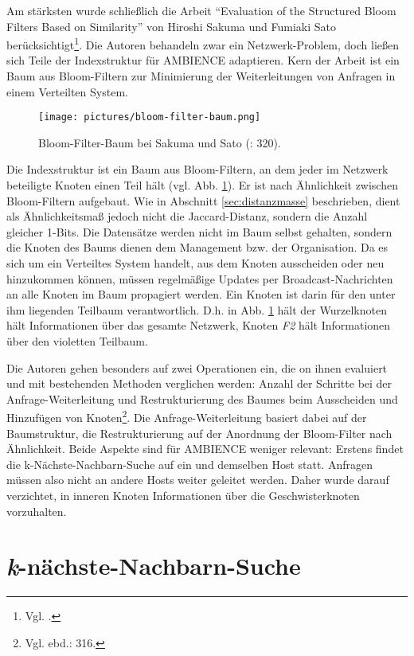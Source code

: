 Am stärksten wurde schließlich die Arbeit "`Evaluation of the Structured Bloom Filters Based on Similarity"' von Hiroshi Sakuma und Fumiaki Sato berücksichtigt\footnote{Vgl. \cite{Sakuma2011}.}. Die Autoren behandeln zwar ein Netzwerk-Problem, doch ließen sich Teile der Indexstruktur für AMBIENCE adaptieren. Kern der Arbeit ist ein Baum aus Bloom-Filtern zur Minimierung der Weiterleitungen von Anfragen in einem Verteilten System. 
\begin{figure}[hpbt]
  \centering
  \texttt{[image: pictures/bloom-filter-baum.png]}\\
  \caption[Bloom-Filter-Baum bei Sakuma und Sato (Bildnachweis: \cite{Sakuma2011}: 320)]{Bloom-Filter-Baum bei Sakuma und Sato (\cite{Sakuma2011}: 320).}\label{fig:pic5}
\end{figure}
Die Indexstruktur ist ein Baum aus Bloom-Filtern, an dem jeder im Netzwerk beteiligte Knoten einen Teil hält (vgl. Abb. \ref{fig:pic5}). Er ist nach Ähnlichkeit zwischen Bloom-Filtern aufgebaut. Wie in Abschnitt \ref{sec:distanzmasse} beschrieben, dient als Ähnlichkeitsmaß jedoch nicht die Jaccard-Distanz, sondern die Anzahl gleicher 1-Bits. Die Datensätze werden nicht im Baum selbst gehalten, sondern die Knoten des Baums dienen dem Management bzw. der Organisation. Da es sich um ein Verteiltes System handelt, aus dem Knoten ausscheiden oder neu hinzukommen können, müssen regelmäßige Updates per Broadcast-Nachrichten an alle Knoten im Baum propagiert werden. Ein Knoten ist darin für den unter ihm liegenden Teilbaum verantwortlich. D.h. in Abb. \ref{fig:pic5} hält der Wurzelknoten hält Informationen über das gesamte Netzwerk, Knoten \textit{F2} hält Informationen über den violetten Teilbaum. 

Die Autoren gehen besonders auf zwei Operationen ein, die on ihnen evaluiert und mit bestehenden Methoden verglichen werden: Anzahl der Schritte bei der Anfrage-Weiterleitung und Restrukturierung des Baumes beim Ausscheiden und Hinzufügen von Knoten\footnote{Vgl. ebd.: 316.}. Die Anfrage-Weiterleitung basiert dabei auf der Baumstruktur, die Restrukturierung auf der Anordnung der Bloom-Filter nach Ähnlichkeit. Beide Aspekte sind für AMBIENCE weniger relevant: Erstens findet die k-Nächste-Nachbarn-Suche auf ein und demselben Host statt. Anfragen müssen also nicht an andere Hosts weiter geleitet werden. Daher wurde darauf verzichtet, in inneren Knoten Informationen über die Geschwisterknoten vorzuhalten. 


\section{\textit{k}-nächste-Nachbarn-Suche}\label{sec:bloom-knn}


